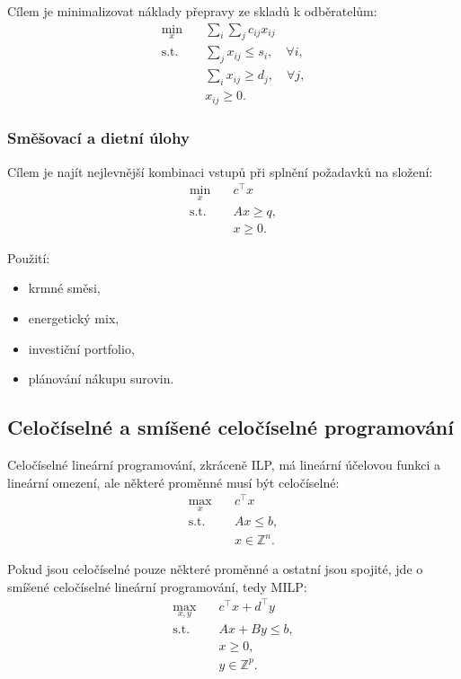 Cílem je minimalizovat náklady přepravy ze skladů k odběratelům:
\[
\begin{aligned}
\min_x \quad & \sum_i\sum_j c_{ij}x_{ij}\\
\text{s.t.}\quad & \sum_j x_{ij}\le s_i,\quad \forall i,\\
& \sum_i x_{ij}\ge d_j,\quad \forall j,\\
& x_{ij}\ge 0.
\end{aligned}
\]

\subsubsection{Směšovací a dietní úlohy}

Cílem je najít nejlevnější kombinaci vstupů při splnění požadavků na složení:
\[
\begin{aligned}
\min_x \quad & c^\top x\\
\text{s.t.}\quad & Ax\ge q,\\
& x\ge 0.
\end{aligned}
\]

Použití:
\begin{itemize}
    \item krmné směsi,
    \item energetický mix,
    \item investiční portfolio,
    \item plánování nákupu surovin.
\end{itemize}

\subsection{Celočíselné a smíšené celočíselné programování}

Celočíselné lineární programování, zkráceně ILP, má lineární účelovou funkci a lineární omezení,
ale některé proměnné musí být celočíselné:
\[
\begin{aligned}
\max_x \quad & c^\top x\\
\text{s.t.}\quad & Ax\le b,\\
& x\in \mathbb{Z}^n.
\end{aligned}
\]

Pokud jsou celočíselné pouze některé proměnné a ostatní jsou spojité, jde o smíšené celočíselné
lineární programování, tedy MILP:
\[
\begin{aligned}
\max_{x,y}\quad & c^\top x+d^\top y\\
\text{s.t.}\quad & Ax+By\le b,\\
& x\ge 0,\\
& y\in \mathbb{Z}^p.
\end{aligned}
\]

